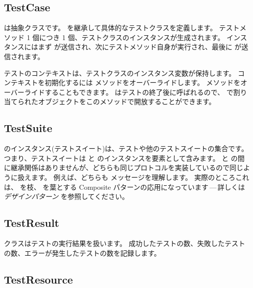 \documentclass[a4paper,10pt,twoside]{book}
\begin{document}
\subsection{TestCase}

 は抽象クラスです。 を継承して具体的なテストクラスを定義します。
テストメソッド 1 個につき 1 個、テストクラスのインスタンスが生成されます。
インスタンスにはまず が送信され、次にテストメソッド自身が実行され、最後に  が送信されます。

テストのコンテキストは、テストクラスのインスタンス変数が保持します。
コンテキストを初期化するには  メソッドをオーバーライドします。
 メソッドをオーバーライドすることもできます。 はテストの終了後に呼ばれるので、 で割り当てられたオブジェクトをこのメソッドで開放することができます。
\subsection{TestSuite}

 のインスタンス(テストスイート)は、テストや他のテストスイートの集合です。
つまり、テストスイートは  と  のインスタンスを要素として含みます。
 と  の間に継承関係はありませんが、どちらも同じプロトコルを実装しているので同じように扱えます。
例えば、どちらも  メッセージを理解します。
実際のところこれは、 を枝、 を葉とする Composite パターンの応用になっています\,---\,詳しくは \textit{デザインパターン} を参照してください\cite{Gamm95a}。
\subsection{TestResult}

 クラスはテストの実行結果を扱います。%
成功したテストの数、失敗したテストの数、エラーが発生したテストの数を記録します。

\subsection{TestResource}
\end{document}
